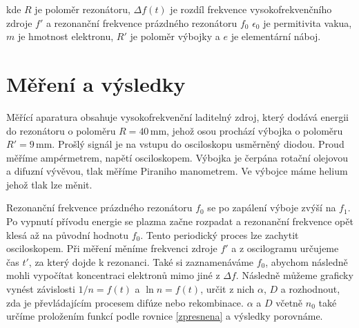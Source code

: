 \documentclass[a4paper,12pt]{article}
\begin{document}
kde $R$ je poloměr rezonátoru, $\Delta f(t)$ je rozdíl frekvence 
vysokofrekvenčního zdroje $f'$ a rezonanční frekvence prázdného rezonátoru 
$f_0$ $\epsilon_0$ je permitivita vakua, $m$ je hmotnost elektronu, $R'$ je 
poloměr výbojky a $e$ je elementární náboj.

\section{Měření a výsledky}
Měřící aparatura obsahuje vysokofrekvenční laditelný zdroj, který dodává energii do rezonátoru o poloměru $R = 40\,\si{\milli\meter}$, jehož osou prochází výbojka o poloměru $R' = 9\,\si{\milli\meter}$. Prošlý signál je na vstupu do osciloskopu usměrněný diodou. Proud měříme ampérmetrem, napětí osciloskopem. Výbojka je čerpána rotační olejovou a difuzní vývěvou, tlak měříme Piraniho manometrem. Ve výbojce máme helium jehož tlak lze měnit.

Rezonanční frekvence prázdného rezonátoru $f_0$ se po zapálení výboje zvýší na 
$f_1$. Po vypnutí přívodu energie se plazma začne rozpadat a rezonanční 
frekvence opět klesá až na původní hodnotu $f_0$. Tento periodický proces lze 
zachytit osciloskopem. Při měření měníme frekvenci zdroje $f'$ a z oscilogramu 
určujeme čas $t'$, za který dojde k rezonanci. Také si zaznamenáváme $f_0$, 
abychom následně mohli vypočítat koncentraci elektronů mimo jiné z $\Delta f$. 
Následně můžeme graficky vynést závislosti $1/n = f(t)$ a $\ln n = f(t)$, 
určit z nich $\alpha$, $D$ a rozhodnout, zda je převládajícím procesem difúze 
nebo rekombinace. $\alpha$ a $D$ včetně $n_0$ také určíme proložením funkcí 
podle rovnice \ref{zpresnena} a výsledky porovnáme.
\end{document}

